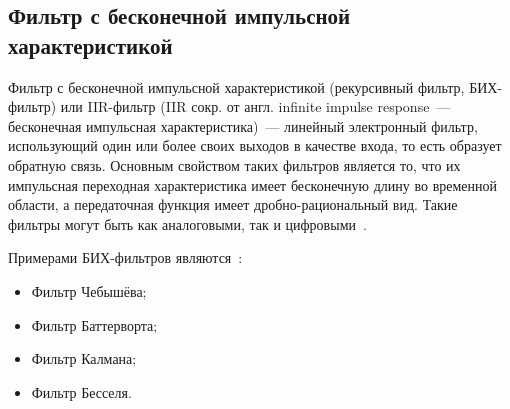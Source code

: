 \subsection{Фильтр с бесконечной импульсной характеристикой}
\label{section:IIR}
Фильтр с бесконечной импульсной характеристикой (рекурсивный фильтр, БИХ-фильтр) или IIR-фильтр (IIR сокр. от англ. \foreignlanguage{english}{infinite impulse response}~--- бесконечная импульсная характеристика)~--- линейный электронный фильтр, использующий один или более своих выходов в качестве входа, то есть образует обратную связь. Основным свойством таких фильтров является то, что их импульсная переходная характеристика имеет бесконечную длину во временной области, а передаточная функция имеет дробно-рациональный вид. Такие фильтры могут быть как аналоговыми, так и цифровыми~\cite{Wiki_IIR}.

Примерами БИХ-фильтров являются~\cite{Wiki_IIR}:
\begin{itemize}
	\item Фильтр Чебышёва;
	\item Фильтр Баттерворта;
	\item Фильтр Калмана;
	\item Фильтр Бесселя.
\end{itemize}

